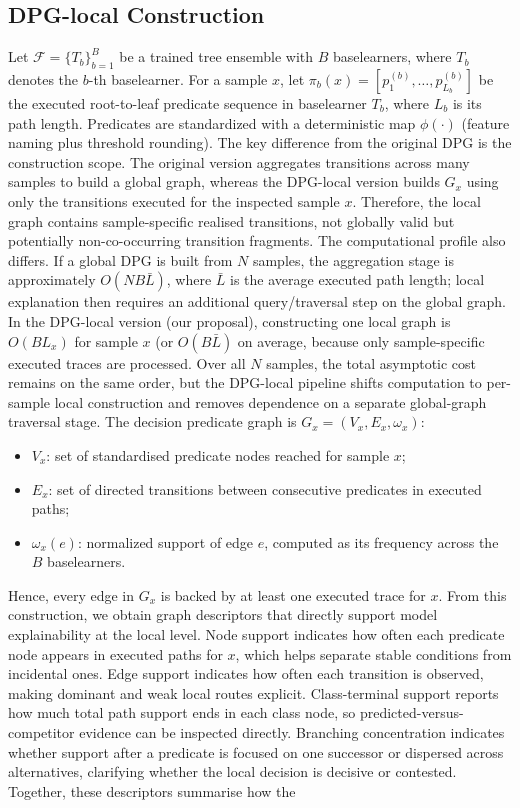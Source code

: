 \documentclass[runningheads]{llncs}
\begin{document}
\subsection{DPG-local Construction}
\label{sec:dpg-construction}
Let $\mathcal{F}=\{T_b\}_{b=1}^B$ be a trained tree ensemble with $B$
baselearners, where $T_b$ denotes the $b$-th baselearner. For a sample $x$, let
$\pi_b(x)=[p^{(b)}_1,\dots,p^{(b)}_{L_b}]$ be the executed root-to-leaf predicate sequence in baselearner $T_b$, where $L_b$ is its path length. Predicates are standardized with a deterministic map $\phi(\cdot)$ (feature naming plus threshold rounding).
The key difference from the original DPG is the construction scope. The original version aggregates transitions across many samples to build a global graph, whereas the DPG-local version builds $G_x$ using only the transitions executed for the inspected sample $x$. Therefore, the local graph contains sample-specific realised transitions, not globally valid but potentially non-co-occurring transition fragments.
The computational profile also differs. If a global DPG is built from $N$ samples, the aggregation stage is approximately $O(NB\bar{L})$, where $\bar{L}$ is the average executed path length; local explanation then requires an additional query/traversal step on the global graph. In the DPG-local version (our proposal), constructing one local graph is $O(BL_x)$ for sample $x$ (or
$O(B\bar{L})$ on average, because only sample-specific executed traces are processed. Over all $N$ samples, the total asymptotic cost remains on the same order, but the DPG-local pipeline shifts computation to per-sample local construction and removes dependence on a separate global-graph traversal stage.
The decision predicate graph is $G_x=(V_x,E_x,\omega_x)$:
\begin{itemize}
  \item $V_x$: set of standardised predicate nodes reached for sample $x$;
  \item $E_x$: set of directed transitions between consecutive predicates in executed paths;
  \item $\omega_x(e)$: normalized support of edge $e$, computed as its
        frequency across the $B$ baselearners.
\end{itemize}
Hence, every edge in $G_x$ is backed by at least one executed trace for $x$. From this construction, we obtain graph descriptors that directly support model explainability at the local level. Node support indicates how often each predicate node appears in executed paths for $x$, which helps separate stable conditions from incidental ones. Edge support indicates how often each transition is observed, making dominant and weak local routes explicit. Class-terminal support reports how much total path support ends in each class node, so predicted-versus-competitor evidence can be inspected directly. Branching concentration indicates whether support after a predicate is focused on one successor or dispersed across alternatives, clarifying whether the local decision is decisive or contested. Together, these descriptors summarise how the
\end{document}
